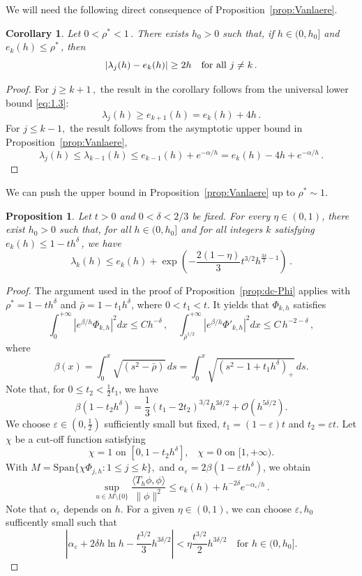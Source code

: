 \documentclass[11pt]{amsart}
\numberwithin{equation}{section}
\newtheorem{proposition}[theorem]{Proposition}
\newtheorem{corollary}[theorem]{Corollary}
\theoremstyle{remark}
\begin{document}
We will need the following  direct consequence of Proposition~\ref{prop:Vanlaere}.
\begin{corollary}\label{corol:gap}
    Let $0<\rho^*<1\,$. There exists $h_0>0$ such that, if $h\in(0,h_0]$ and $e_k(h)\leq \rho^*\,$, then
    \[|\lambda_j(h)-e_k(h)|\geq 2h\quad\text{for all $j\not=k$\,.}\]
\end{corollary}
%
%
\begin{proof}
For $j\geq k+1\,,$ the result in the corollary follows from the universal lower bound \eqref{eq:1.3}:
\[\lambda_j(h)\geq e_{k+1}(h)=e_k(h)+4h\,.\]
For $j\leq k-1,$ the result follows from the asymptotic upper bound in Proposition~\ref{prop:Vanlaere},
\[\lambda_j(h)\leq\lambda_{k-1}(h)\leq  e_{k-1}(h)+e^{-\alpha/h}=e_k(h)-4h+e^{-\alpha/h}\,.\]
\end{proof}

We can push the upper bound in Proposition~\ref{prop:Vanlaere} up to $\rho^*\sim 1$.

\begin{proposition}\label{prop:2.5}
 Let $t>0$ and $0<\delta<2/3$ be fixed.  For every $\eta\in(0,1)$, there exist $h_0>0$ such that, for all $h\in(0,h_0]$ and for all integers $k$ satisfying $e_k(h)\leq 1-th^\delta\,$, we have
\[\lambda_k(h)\leq e_k(h)+\exp\left(-\frac{2(1-\eta)}{3}t^{3/2}h^{\frac{3\delta}{2}-1}\right)\,.\]
\end{proposition}
\begin{proof}
    The argument used in the proof of Proposition~\ref{prop:dc-Phi} applies with
    $\rho^*=1-th^\delta$ and $\bar\rho=1-t_1h^\delta$, where $0<t_1<t$. It yields that  $\Phi_{k,h}$ satisfies
    \[ \int_{0}^{+\infty}|e^{\beta/h}\Phi_{k,h}|^2dx\leq Ch^{-\delta}\,,\quad \int_{\bar\rho^{1/2}}^{+\infty}|e^{\beta/h}\Phi'_{k,h}|^2dx\leq C\, h^{-2-\delta}\,,\]
    where
    \[\beta(x)=\int_0^{x}\sqrt{(s^2-\bar\rho)}\,ds=\int_0^x\sqrt{(s^2-1+t_1h^\delta)_+}\,ds.\]
    Note that, for $0\leq t_2<\frac12 t_1$, we have
    \[\beta(1-t_2h^\delta)=\frac13(t_1-2t_2)^{3/2}h^{3\delta/2}+\mathcal O(h^{5\delta/2}).\]
    We choose $\varepsilon\in(0,\frac12)$ sufficiently small but fixed,  $t_1=(1-\varepsilon)t$ and $t_2=\varepsilon t$. Let $\chi$ be a cut-off function satisfying
    \[\chi=1\text{ on $[0,1-t_2 h^\delta]$,}\quad \chi=0\text{ on $[1,+\infty)$.}\]
    With $M=\mathrm{Span}\{\chi\Phi_{j,h}\colon 1\leq j\leq k\},$ and $\alpha_\varepsilon=2\beta(1-\varepsilon th^\delta)$, we obtain
    \[\sup_{u\in M\setminus\{0\}}\frac{\langle T_h\phi,\phi\rangle}{\|\phi\|^2}\leq e_k(h)+h^{-2\delta}e^{-\alpha_\varepsilon/h}\,.\]
     Note that $\alpha_\varepsilon$ depends on $h$. For a given $\eta\in(0,1)$, we can choose $\varepsilon,h_0$ sufficently small such that
    \[\left|\alpha_\varepsilon+2\delta h\ln h-\frac{t^{3/2}}{3}h^{3\delta/2}\right|<\eta \frac{t^{3/2}}{2}h^{3\delta/2}\quad\text{for }h\in(0,h_0].\]
\end{proof}
\end{document}

